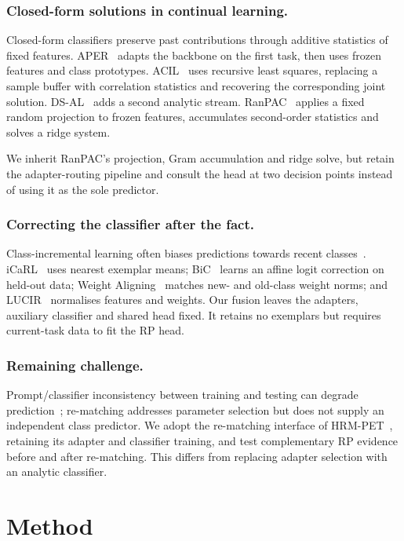 \documentclass[runningheads]{llncs}
\begin{document}
\subsubsection{Closed-form solutions in continual learning.}
Closed-form classifiers preserve past contributions through additive statistics
of fixed features. APER~\cite{ref_adam} adapts the backbone on the first task,
then uses frozen features and class prototypes. ACIL~\cite{ref_acil} uses
recursive least squares, replacing a sample buffer with correlation statistics
and recovering the corresponding joint solution. DS-AL~\cite{ref_dsal} adds a
second analytic stream. RanPAC~\cite{ref_ranpac} applies a fixed random
projection to frozen features, accumulates second-order statistics and solves
a ridge system.

We inherit RanPAC's projection, Gram accumulation and ridge solve, but retain
the adapter-routing pipeline and consult the head at two decision points
instead of using it as the sole predictor.

\subsubsection{Correcting the classifier after the fact.}
Class-incremental learning often biases predictions towards recent
classes~\cite{ref_survey}. iCaRL~\cite{ref_icarl} uses nearest exemplar means;
BiC~\cite{ref_bic} learns an affine logit correction on held-out data;
Weight Aligning~\cite{ref_wa} matches new- and old-class weight norms; and
LUCIR~\cite{ref_lucir} normalises features and weights. Our fusion leaves the
adapters, auxiliary classifier and shared head fixed. It retains no exemplars
but requires current-task data to fit the RP head.

\subsubsection{Remaining challenge.}
Prompt/classifier inconsistency between training and testing can degrade
prediction~\cite{ref_cprompt}; re-matching addresses parameter selection but
does not supply an independent class predictor. We adopt the re-matching
interface of HRM-PET~\cite{ref_hrmpet}, retaining its adapter and classifier
training, and test complementary RP evidence before and after re-matching.
This differs from replacing adapter selection with an analytic classifier.

\section{Method}
\label{sec:method}
\end{document}

